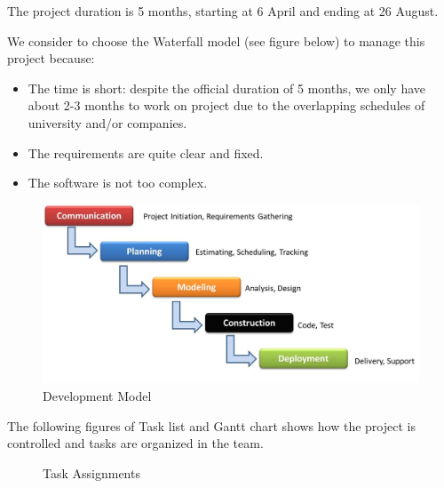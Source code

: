 \documentclass[11pt]{article}
\begin{document}
\par\noindent The project duration is 5 months, starting at 6 April and ending at 26 August.
\par\noindent We consider to choose the Waterfall model (see figure below) to manage this project because: 
\begin{itemize}
\item The time is short: despite the official duration of 5 months, we only have about 2-3 months to work on project due to the overlapping schedules of university and/or companies.
\item The requirements are quite clear and fixed.
\item The software is not too complex.
\end{itemize}
\begin{figure}[H] 
  \includegraphics[width=\linewidth]{P3.jpg}
  \caption {Development Model} 
\end{figure}
\par\noindent The following figures of Task list and Gantt chart shows how the project is controlled and tasks are organized in the team.
\begin{figure}[H] 
  \caption {Task Assignments} 
\end{figure}
\end{document}
